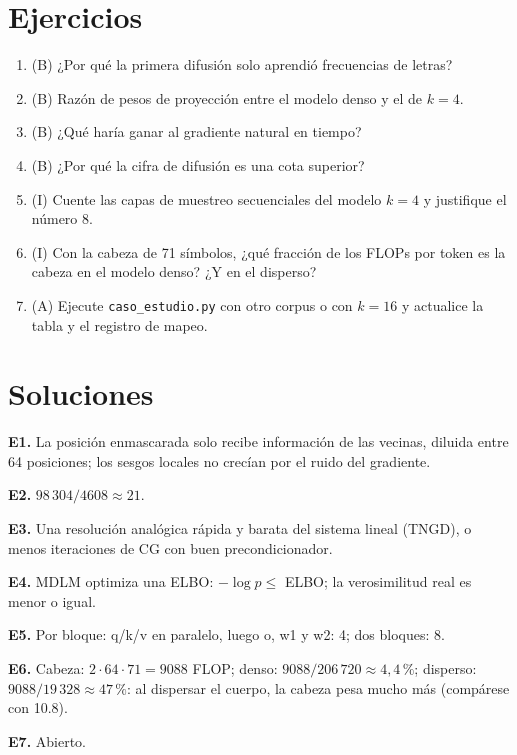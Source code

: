 \documentclass[11pt,a4paper]{article}
\begin{document}
\section{Ejercicios}
\begin{enumerate}[label=\textbf{E\arabic*.}]
\item (B) ¿Por qué la primera difusión solo aprendió frecuencias de letras?
\item (B) Razón de pesos de proyección entre el modelo denso y el de $k=4$.
\item (B) ¿Qué haría ganar al gradiente natural en tiempo?
\item (B) ¿Por qué la cifra de difusión es una cota superior?
\item (I) Cuente las capas de muestreo secuenciales del modelo $k=4$ y justifique el número 8.
\item (I) Con la cabeza de 71 símbolos, ¿qué fracción de los FLOPs por token es la cabeza en el modelo denso? ¿Y en el disperso?
\item (A) Ejecute \texttt{caso\_estudio.py} con otro corpus o con $k=16$ y actualice la tabla y el registro de mapeo.
\end{enumerate}
\section{Soluciones}
\begin{solucion}
\textbf{E1.} La posición enmascarada solo recibe información de las vecinas, diluida entre 64 posiciones; los sesgos locales no crecían por el ruido del gradiente.

\textbf{E2.} $98\,304/4608\approx21$.

\textbf{E3.} Una resolución analógica rápida y barata del sistema lineal (TNGD), o menos iteraciones de CG con buen precondicionador.

\textbf{E4.} MDLM optimiza una ELBO: $-\log p\le$ ELBO; la verosimilitud real es menor o igual.

\textbf{E5.} Por bloque: q/k/v en paralelo, luego o, w1 y w2: 4; dos bloques: 8.

\textbf{E6.} Cabeza: $2\cdot64\cdot71=9088$ FLOP; denso: $9088/206\,720\approx4{,}4\,\%$; disperso: $9088/19\,328\approx47\,\%$: al dispersar el cuerpo, la cabeza pesa mucho más
(compárese con 10.8).

\textbf{E7.} Abierto.
\end{solucion}
\end{document}

